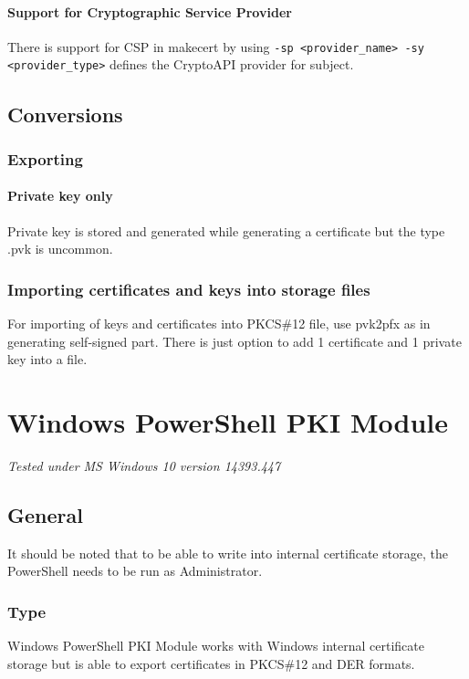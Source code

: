 \documentclass[10pt, a4paper]{report}
\begin{document}
    \subsubsection{Support for Cryptographic Service Provider}
There is support for CSP in makecert by using \verb+-sp <provider_name> -sy <provider_type>+ defines the CryptoAPI provider for subject.
\section{Conversions}

  \subsection{Exporting}
  
    \subsubsection{Private key only}
Private key is stored and generated while generating a certificate but the type .pvk is uncommon.

  \subsection{Importing certificates and keys into storage files}
For importing of keys and certificates into PKCS\#12 file, use pvk2pfx as in generating self-signed part. There is just option to add 1 certificate and 1 private key into a file.


\chapter{Windows PowerShell PKI Module}

\textit{Tested under MS Windows 10 version 14393.447}

\section{General}

It should be noted that to be able to write into internal certificate storage, the PowerShell needs to be run as Administrator.
  \subsection{Type}
Windows PowerShell PKI Module works with Windows internal certificate storage but is able to export certificates in PKCS\#12 and DER formats. 
\end{document}
